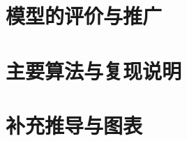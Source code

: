 \documentclass[12pt,a4paper]{ctexart}
\begin{document}
\section{模型的评价与推广}


\printbibliography[title={参考文献}]

\appendix
\section{主要算法与复现说明}
\section{补充推导与图表}
\end{document}
